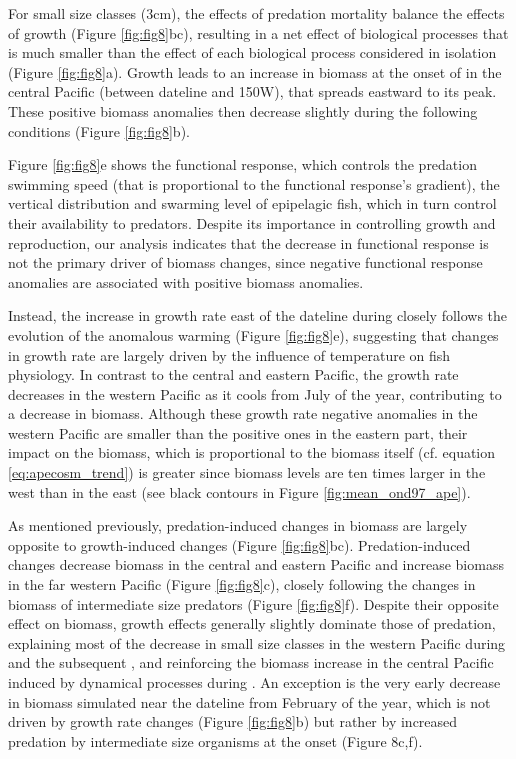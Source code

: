 For small size classes (3cm), the effects of predation mortality balance the effects of growth (Figure \ref{fig:fig8}bc), resulting in a net effect of biological processes that is much smaller than the effect of each biological process considered in isolation (Figure \ref{fig:fig8}a). Growth leads to an increase in biomass at the onset of \nino{} in the central Pacific (between dateline and 150\degree{}W), that spreads eastward to its peak. These positive biomass anomalies then decrease slightly during the following \nina{} conditions (Figure \ref{fig:fig8}b).

Figure \ref{fig:fig8}e shows the functional response, which controls the predation swimming speed (that is proportional to the functional response's gradient), the vertical distribution and swarming level of epipelagic fish, which in turn control their availability to predators.  Despite its importance in controlling growth and reproduction, our analysis indicates that the decrease in functional response is not the primary driver of biomass changes, since negative functional response anomalies are associated with positive biomass anomalies.

Instead, the increase in growth rate east of the dateline during \nino{} closely follows the evolution of the anomalous warming (Figure \ref{fig:fig8}e), suggesting that changes in growth rate are largely driven by the influence of temperature on fish physiology. In contrast to the central and eastern Pacific, the growth rate decreases in the western Pacific as it cools from July of the \nino{} year, contributing to a decrease in biomass. Although these growth rate negative anomalies in the western Pacific are smaller than the positive ones in the eastern part, their impact on the biomass, which is proportional to the biomass itself (cf. equation \ref{eq:apecosm_trend}) is greater since biomass levels are ten times larger in the west than in the east (see black contours in Figure \ref{fig:mean_ond97_ape}).

As mentioned previously, predation-induced changes in biomass are largely opposite to growth-induced changes  (Figure \ref{fig:fig8}bc). Predation-induced changes decrease biomass in the central and eastern Pacific and increase biomass in the far western Pacific (Figure \ref{fig:fig8}c), closely following the changes in biomass of intermediate size predators (Figure \ref{fig:fig8}f). Despite their opposite effect on biomass, growth effects generally slightly dominate those of predation, explaining most of the decrease in small size classes in the western Pacific during \nino{} and the subsequent \nina{}, and reinforcing the biomass increase in the central Pacific induced by dynamical processes during \nino{}. An exception is the very early decrease in biomass simulated near the dateline from February of the \nino{} year, which is not driven by growth rate changes (Figure \ref{fig:fig8}b) but rather by increased predation by intermediate size organisms at the \nino{} onset (Figure 8c,f).

